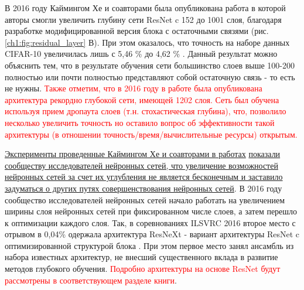 \documentclass[12pt]{article}
\begin{document}
\begin{sloppypar}
В 2016 году Каймингом Хе и соавторами была опубликована работа \cite{he2016identity} в которой авторы смогли увеличить глубину сети ResNet c 152 до 1001 слоя, благодаря разработке модифицированной версия блока с остаточными связями (рис. \ref{ch1:fig:residual_layer} В). При этом оказалось, что точность на наборе данных CIFAR-10 увеличилась лишь с 5,46 \% до 4,62 \% \cite{he2016identity}. Данный результат можно объяснить тем, что в результате обучения сети большинство слоев выше 100-200 полностью или почти полностью представляют собой остаточную связь - то есть не нужны. 
\textcolor{red}{
Также отметим, что в 2016 году в работе \cite{huang2016deep} была опубликована архитектура рекордно глубокой сети, имеющей 1202 слоя. Сеть был обучена используя прием дропаута слоев (т.н. стохастическая глубина), что, позволило несколько увеличить точность но оставило вопрос об эффективности такой архитектуры (в отношении точность/время/вычислительные ресурсы) открытым.}

\uline{Эксперименты проведенные Каймингом Хе и соавторами в работах} \cite{he2016deep, he2016identity} \uline{показали сообществу исследователей нейронных сетей, что увеличение возможностей нейронных сетей за счет их углубления не является бесконечным и заставило задуматься о других  путях совершенствования нейронных сетей}. В 2016 году сообщество исследователей нейронных сетей начало работать на увеличением ширины слоя нейронных сетей при фиксированном числе слоев, а затем перешло к оптимизации каждого слоя. Так, в соревнованиях ILSVRC 2016 второе место с отрывом в 0,04\% одержала архитектура ResNeXt - вариант архитектуры ResNet c оптимизированной структурой блока \cite{xie2017aggregated}. При этом первое место занял ансамбль из набора известных архитектур, не внесший существенного вклада в развитие методов глубокого обучения\cite{Tsang2018Trimps}. 
\textcolor{red}{Подробно архитектуры на основе ResNet будут рассмотрены в соответствующем разделе книги}.


\end{sloppypar}
\end{document}
